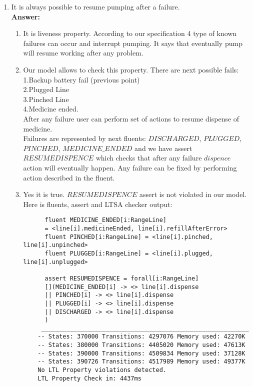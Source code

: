 \documentclass{article}
\begin{document}
\begin{enumerate}
    \item It is always possible to resume pumping after a failure.\\
    \textbf{Answer:}
    \begin{enumerate}
    \item It is liveness property. According to our specification 4 type of known failures can occur and interrupt
    pumping. It says that eventually pump will resume working after any problem. 
    \item Our model allows to check this property. 
    There are next possible fails:\\
    1.Backup battery fail (previous point)\\
    2.Plugged Line \\
    3.Pinched Line \\
    4.Medicine ended.\\
    After any failure user can perform set of actions to resume dispense of medicine. \\ Failures are represented by next fluents: $DISCHARGED$, $PLUGGED$, $PINCHED$, $MEDICINE\_ENDED$ and we have assert $RESUMEDISPENCE$ which checks that after any failure $dispence$ action will eventually happen. Any failure can be fixed by performing action described in the fluent.\\   
    \item Yes it is true. $RESUMEDISPENCE$ assert is not violated in our model. Here is fluents, assert and LTSA checker output:
      \begin{verbatim}
      fluent MEDICINE_ENDED[i:RangeLine] 
      = <line[i].medicineEnded, line[i].refillAfterError>
      fluent PINCHED[i:RangeLine] = <line[i].pinched, line[i].unpinched>
      fluent PLUGGED[i:RangeLine] = <line[i].plugged, line[i].unplugged>
      
      assert RESUMEDISPENCE = forall[i:RangeLine]
      [](MEDICINE_ENDED[i] -> <> line[i].dispense
      || PINCHED[i] -> <> line[i].dispense
      || PLUGGED[i] -> <> line[i].dispense
      || DISCHARGED -> <> line[i].dispense
      )
     __________________________________________________________
    -- States: 370000 Transitions: 4297076 Memory used: 42270K
    -- States: 380000 Transitions: 4405020 Memory used: 47613K
    -- States: 390000 Transitions: 4509834 Memory used: 37128K
    -- States: 390726 Transitions: 4517989 Memory used: 49377K
    No LTL Property violations detected.
    LTL Property Check in: 4437ms
    \end{verbatim} 
    \end{enumerate}    
    

\end{enumerate}
\end{document}
